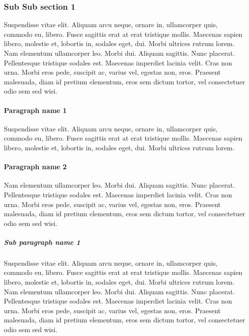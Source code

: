 \documentclass[Main]{subfiles}
\begin{document}
		\subsubsection{Sub Sub section 1} %
			\label{ssub:sub_sub_section_1}
			Suspendisse vitae elit. Aliquam arcu neque, ornare in, ullamcorper quis, commodo eu, libero.
			Fusce sagittis erat at erat tristique mollis. 
			Maecenas sapien libero, molestie et, lobortis in, sodales eget, dui.
			Morbi ultrices rutrum lorem.
			Nam elementum ullamcorper leo. Morbi dui. Aliquam sagittis. 
			Nunc placerat. Pellentesque tristique sodales est. Maecenas imperdiet lacinia velit. 
			Cras non urna.
			Morbi eros pede, suscipit ac, varius vel, egestas non, eros. 
			Praesent malesuada, diam id pretium elementum, eros sem dictum tortor, vel consectetuer odio sem sed wisi.

			\paragraph{Paragraph name 1} %
				\label{par:paragraph_name_1}
				Suspendisse vitae elit. Aliquam arcu neque, ornare in, ullamcorper quis, commodo eu, libero.
				Fusce sagittis erat at erat tristique mollis. 
				Maecenas sapien libero, molestie et, lobortis in, sodales eget, dui.
				Morbi ultrices rutrum lorem.
				

			\paragraph{Paragraph name 2} %
				\label{par:paragraph_name_2}
				Nam elementum ullamcorper leo. Morbi dui. Aliquam sagittis. 
				Nunc placerat. Pellentesque tristique sodales est. Maecenas imperdiet lacinia velit. 
				Cras non urna.
				Morbi eros pede, suscipit ac, varius vel, egestas non, eros. 
				Praesent malesuada, diam id pretium elementum, eros sem dictum tortor, vel consectetuer odio sem sed wisi.

				\subparagraph{Sub paragraph name 1} %
					\label{subp:sub_paragraph_name_1}
					Suspendisse vitae elit. Aliquam arcu neque, ornare in, ullamcorper quis, commodo eu, libero.
					Fusce sagittis erat at erat tristique mollis. 
					Maecenas sapien libero, molestie et, lobortis in, sodales eget, dui.
					Morbi ultrices rutrum lorem.
					Nam elementum ullamcorper leo. Morbi dui. Aliquam sagittis. 
					Nunc placerat. Pellentesque tristique sodales est. Maecenas imperdiet lacinia velit. 
					Cras non urna.
					Morbi eros pede, suscipit ac, varius vel, egestas non, eros. 
					Praesent malesuada, diam id pretium elementum, eros sem dictum tortor, vel consectetuer odio sem sed wisi.
				




\end{document}

